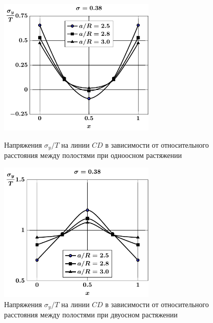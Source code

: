 \begin{russian}
\begin{figure}[h!]
\centering\footnotesize
\parbox[b]{7.5cm}{\centering\includegraphics[width=7.5cm]{spheres-cav13-a-t1-sig_y-cd.pdf}
\caption{Напряжения $\sigma_y/T$ на линии $CD$ в зависимости от относительного расстояния между полостями при одноосном растяжении
\label{f:8:46}}}\hfil\hfil
\parbox[b]{7.5cm}{\centering\includegraphics[width=7.5cm]{spheres-cav13-a-t2-sig_y-cd.pdf}
\caption{Напряжения $\sigma_y/T$ на линии $CD$ в зависимости от относительного расстояния между полостями при двуосном растяжении
\label{f:8:47}}}
\end{figure}


\end{russian}
